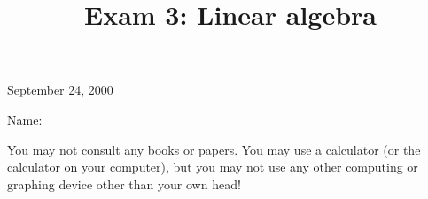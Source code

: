 \documentclass[10pt]{amsart}
\title[\hskip 0.2inExam 3\hfill Name:\hskip 2in]{Exam 3:  Linear algebra}
\begin{document}

\begin{figure}[h]
\centerline{
}
\end{figure}

\centerline{\Large{}}
\medskip

\maketitle

\vfill


\centerline{\LARGE{September 24, 2000}}

\vskip 1in

\hskip 2in\Large{Name:}

\vskip 1in

\noindent You may  not consult any books or papers.  You may use a
calculator (or the calculator on your computer), but you may not use
any other computing or graphing device other than your own head!

\vfill\pagebreak
\end{document}
